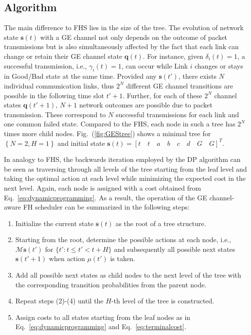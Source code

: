 \subsection{Algorithm}
The main difference to FHS lies in the size of the tree. The evolution of
network state $\boldsymbol{s}(t)$ with a GE channel not only depends on the
outcome of packet transmissions but is also simultaneously affected by the fact
that each link can change or retain their GE channel state $\boldsymbol{q}(t) $.
For instance, given $\delta_i(t)=1$, a successful transmission, i.e.,
$\gamma_i(t)=1$, can occur while Link $i$ changes or stays in Good/Bad state at
the same time. Provided any $\boldsymbol{s}(t')$, there exists $N$ individual
communication links, thus $2^N$ different GE channel transitions are possible in
the following time slot $t'+1$. Further, for each of these $2^N$ channel states
$\boldsymbol{q}(t'+1)$, $N+1$ network outcomes are possible due to packet
transmission. These correspond to $N$ successful transmissions for each link and
one common failed state. Compared to the FHS, each node in such a tree has $2^N$
times more child nodes. Fig.~(\ref{fig:GEStree}) shows a minimal tree for
$\left\{N=2, H=1\right\}$ and initial state $\boldsymbol{s}(t)=\left[t\quad
t\quad a\quad b\quad c\quad d\quad G\quad G \right]^T$.

In analogy to FHS, the backwards iteration employed by the DP algorithm can be
seen as traversing through all levels of the tree starting from the leaf level
and taking the optimal action at each level while minimizing the expected cost
in the next level. Again, each node is assigned with a cost obtained from
Eq.~\eqref{eq:dynamicprogramming}. As a result, the operation of the GE
channel-aware FH scheduler can be summarized in the following steps:

\begin{enumerate}
	\item Initialize the current state $\boldsymbol{s}(t)$ as the root of a tree
	structure.
	\item Starting from the root, determine the possible actions at each node,
	i.e., $\mathcal{M}\boldsymbol{s}(t')$ for $\{t': t \leq t' < t + H \}$ and
	subsequently all possible next states $\boldsymbol{s}(t' + 1)$ when action
	$\mu(t')$ is taken.
	\item Add all possible next states as child nodes to the next level of the
	tree with the corresponding transition probabilities from the parent node.
	\item Repeat steps (2)-(4) until the $H$-th level of the tree is constructed.
	\item Assign costs to all states starting from the leaf nodes as in
	Eq.~\eqref{eq:dynamicprogramming} and Eq.~\eqref{eq:terminalcost}.
\end{enumerate}

